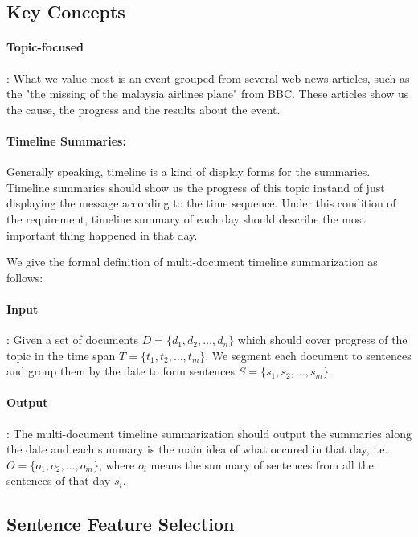 \documentclass{acm_proc_article-sp}
\begin{document}
\subsection{Key Concepts}
\paragraph{Topic-focused}: What we value most is an event grouped from several web news articles, such as the "the missing of the malaysia airlines plane" from BBC. These articles show us the cause, the progress and the results about the event. 

\paragraph{Timeline Summaries:} Generally speaking, timeline is a kind of display forms for the summaries. Timeline summaries should show us the progress of this topic instand of just displaying the message according to the time sequence. Under this condition of the requirement, timeline summary of each day should describe the most important thing happened in that day.

We give the formal definition of multi-document timeline summarization as follows:

\paragraph{Input}: Given a set of documents $D=\{d_1, d_2, \dots, d_n\}$ which should cover progress of the topic in the time span $T=\{t_1, t_2, \dots, t_m\}$. We segment each document to sentences and group them by the date to form sentences $S=\{s_1, s_2, \dots, s_m\}$. 

\paragraph{Output}: The multi-document timeline summarization should output the summaries along the date and each summary is the main idea of what occured in that day, i.e. $O=\{o_1, o_2, \dots, o_m\}$, where $o_i$ means the summary of sentences from all the sentences of that day $s_i$. 


\subsection{Sentence Feature Selection}
\end{document}
